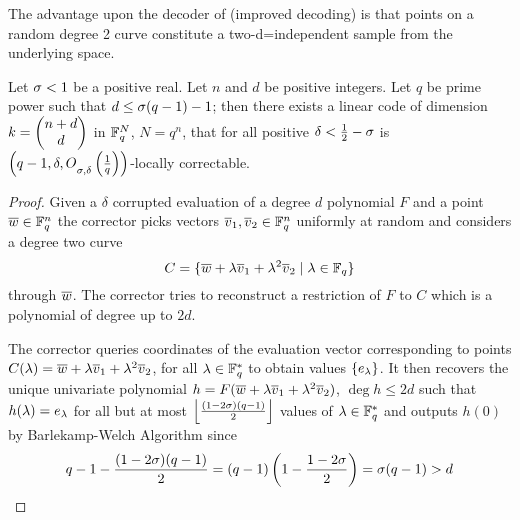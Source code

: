 The advantage upon the decoder of (improved decoding) is that points on a random degree 2 curve constitute a two-d=independent sample from the underlying space.
\begin{theorem}
	Let $\sigma<1$ be a positive real. Let $n$ and $d$ be positive integers. Let $q$ be prime power such that $d\leq \sigma(q-1)-1$; then there exists a linear code of dimension $k=\left(\begin{matrix} n+d\\ d \end{matrix}\right)$ in $\mathbb{F}_q^{N}$, $N=q^n$, that for all positive $\delta< \frac12-\sigma$ is $\left( q-1,\delta,O\strut_{\sigma,\delta}\left(\frac1q\right)\right)$-locally correctable.
\end{theorem}
\begin{proof}
	Given a $\delta$ corrupted evaluation of a degree $d$ polynomial $F$ and a point $\overline{w}\in \mathbb{F}_q^n$ the corrector picks vectors $\overline{v}_1,\overline{v}_2\in \mathbb{F}_q^n$ uniformly at random and considers a degree two curve $$C=\{\overline{w}+\lambda\overline{v}_1+\lambda^2\overline{v}_2\mid \lambda \in \mathbb{F}_q\}$$through $\overline{w}$. The corrector tries to reconstruct a restriction of $F$ to $C$ which is a polynomial of degree up to $2d$.
	
	The corrector queries coordinates of the evaluation vector corresponding to points $C(\lambda)=\overline{w}+\lambda\overline{v}_1+\lambda^2\overline{v}_2$, for all $\lambda\in \mathbb{F}_q^*$ to obtain values $\{e_{\lambda}\}$. It then  recovers the unique univariate polynomial $h=F(\overline{w}+\lambda\overline{v}_1+\lambda^2\overline{v}_2)$, $\deg h\leq 2d$ such that $h(\lambda)=e_{\lambda}$ for all but at most $\left\lfloor \frac{(1-2\sigma)(q-1)}2\right\rfloor$ values of $\lambda\in \mathbb{F}_q^*$ and outputs $h(0)$ by Barlekamp-Welch Algorithm since $$q-1-\frac{(1-2\sigma)(q-1)}2=(q-1)\left(1-\frac{1-2\sigma}{2}\right)=\sigma(q-1)>d$$
	

\end{proof}
